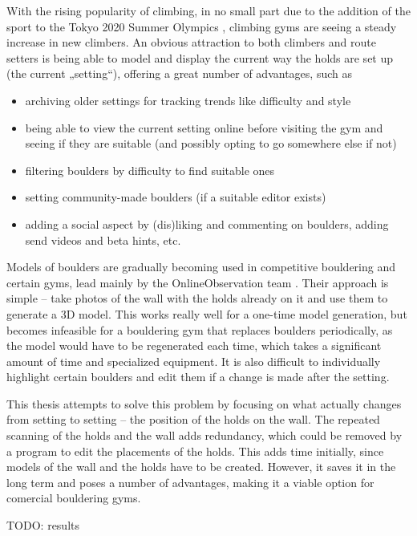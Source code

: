 

With the rising popularity of climbing, in no small part due to the addition of the sport to the Tokyo 2020 Summer Olympics \cite{olympics}, climbing gyms are seeing a steady increase in new climbers.
An obvious attraction to both climbers and route setters is being able to model and display the current way the holds are set up (the current „setting“), offering a great number of advantages, such as

\begin{itemize}
	\item archiving older settings for tracking trends like difficulty and style
	\item being able to view the current setting online before visiting the gym and seeing if they are suitable (and possibly opting to go somewhere else if not)
	\item filtering boulders by difficulty to find suitable ones
	\item setting community-made boulders (if a suitable editor exists)
	\item adding a social aspect by (dis)liking and commenting on boulders, adding send videos and beta hints, etc.
\end{itemize}

Models of boulders are gradually becoming used in competitive bouldering and certain gyms, lead mainly by the OnlineObservation team \cite{onlineobservation}.
Their approach is simple -- take photos of the wall with the holds already on it and use them to generate a 3D model.
This works really well for a one-time model generation, but becomes infeasible for a bouldering gym that replaces boulders periodically, as the model would have to be regenerated each time, which takes a significant amount of time and specialized equipment.
It is also difficult to individually highlight certain boulders and edit them if a change is made after the setting.

This thesis attempts to solve this problem by focusing on what actually changes from setting to setting -- the position of the holds on the wall.
The repeated scanning of the holds and the wall adds redundancy, which could be removed by a program to edit the placements of the holds.
This adds time initially, since models of the wall and the holds have to be created.
However, it saves it in the long term and poses a number of advantages, making it a viable option for comercial bouldering gyms.


TODO: results

